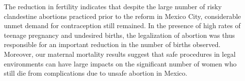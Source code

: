 \documentclass[a4paper, 11pt]{article}
\begin{document}
\begin{spacing}{2}
The reduction in fertility indicates that despite the large number of risky clandestine abortions practiced prior to the reform in Mexico City, considerable unmet demand for contraception still remained. In the presence of high rates of teenage pregnancy and undesired births, the legalization of abortion was thus responsible for an important reduction in the number of births observed. Moreover, our maternal mortality results suggest that safe procedures in legal environments can have large impacts on the significant number of women who still die from complications due to unsafe abortion in Mexico. 
 
\end{spacing}
\newpage


\end{document}
